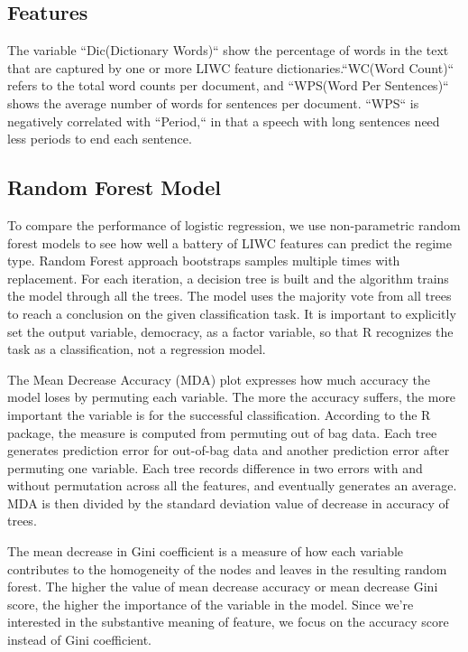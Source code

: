 \documentclass[12pt]{article}
\begin{document}
\subsection{Features}
The variable ``Dic(Dictionary Words)`` show the percentage of words in the text that are captured by one or more LIWC feature dictionaries.``WC(Word Count)`` refers to the total word counts per document, and ``WPS(Word Per Sentences)`` shows the average number of words for sentences per document. ``WPS`` is negatively correlated with ``Period,`` in that a speech with long sentences need less periods to end each sentence.

\subsection{Random Forest Model}
To compare the performance of logistic regression, we use non-parametric random forest models to see how well a battery of LIWC features can predict the regime type.
Random Forest approach bootstraps samples multiple times with replacement. For each iteration, a decision tree is built and the algorithm trains the model through all the trees. The model uses the majority vote from all trees to reach a conclusion on the given classification task. It is important to explicitly set the output variable, democracy, as a factor variable, so that R recognizes the task as a classification, not a regression model.

The Mean Decrease Accuracy (MDA) plot expresses how much accuracy the model loses by permuting each variable. The more the accuracy suffers, the more important the variable is for the successful classification. According to the \textcite{liaw_classification_2002} R package, the measure is computed from permuting out of bag data. Each tree generates prediction error for out-of-bag data and another prediction error after permuting one variable. Each tree records difference in two errors with and without permutation across all the features, and eventually generates an average. MDA is then divided by the standard deviation value of decrease in accuracy of trees. 

The mean decrease in Gini coefficient is a measure of how each variable contributes to the homogeneity of the nodes and leaves in the resulting random forest. The higher the value of mean decrease accuracy or mean decrease Gini score, the higher the importance of the variable in the model. Since we're interested in the substantive meaning of feature, we focus on the accuracy score instead of Gini coefficient.
\end{document}
